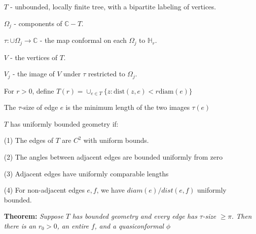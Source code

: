 \documentclass{beamer}
\begin{document}
\begin{frame}

{\tiny $T$ - unbounded, locally finite tree, with a bipartite labeling of vertices.

$\Omega_j$ - components of $\mathbb{C}-T$.

$\tau: \cup \Omega_j \rightarrow \mathbb{C}$ - the map conformal on each $\Omega_j$ to $\mathbb{H}_r$.

$V$ - the vertices of $T$. 

$V_j$ - the image of $V$ under $\tau$ restricted to $\Omega_j$.

For $r > 0$, define $T(r) = \cup_{e\in T} \{z : \textrm{dist}(z,e) < r\textrm{diam}(e) \}$

The $\tau$-size of edge $e$ is the minimum length of the two images $\tau(e)$

\vspace{2.5mm}

$T$ has uniformly bounded geometry if: 

\hspace{5mm} (1) The edges of $T$ are $C^2$ with uniform bounds. 

\hspace{5mm} (2) The angles between adjacent edges are bounded uniformly from zero

\hspace{5mm} (3) Adjacent edges have uniformly comparable lengths

\hspace{5mm} (4) For non-adjacent edges $e, f$, we have $diam(e)/dist(e,f)$ uniformly bounded. 

 }
\vspace{5mm}
{\bf Theorem:} {\it  Suppose $T$ has bounded geometry and every edge has $\tau$-size $\geq \pi.$  Then there is an $r_0 > 0$, an entire $f$, and a quasiconformal $\phi$}  

\end{frame}
\end{document}
